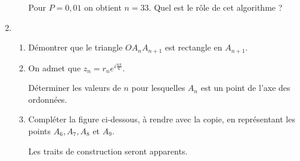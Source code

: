 \begin{enumerate}
\begin{enumerate}[label=\alph*.]
     Pour $P=0,01$ on obtient $n=33$. Quel est le rôle de cet algorithme ?
\end{enumerate}
\item
\begin{enumerate}[label=\alph*.]
     \item
     Démontrer que le triangle $OA_{n}A_{n+1}$ est rectangle en $A_{n+1}$.
     \item
     On admet que $z_{n}=r_{n}e^{i\frac{n\pi }{6}}$.
     \par
     Déterminer les valeurs de $n$ pour lesquelles $A_{n}$ est un point de l'axe des ordonnées.
     \item
     Compléter la figure ci-dessous, à rendre avec la copie, en représentant les points $A_{6}, A_{7}, A_{8}$ et $A_{9}$.
     \par
     Les traits de construction seront apparents.
\begin{center}
\end{center}
\end{enumerate}
\end{enumerate}
